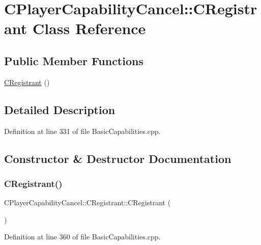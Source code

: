 \hypertarget{classCPlayerCapabilityCancel_1_1CRegistrant}{}\section{C\+Player\+Capability\+Cancel\+:\+:C\+Registrant Class Reference}
\label{classCPlayerCapabilityCancel_1_1CRegistrant}
\subsection*{Public Member Functions}
\begin{DoxyCompactItemize}
\item 
\hyperlink{classCPlayerCapabilityCancel_1_1CRegistrant_a78f5bc9125ca55fc86efdabf1faaa363}{C\+Registrant} ()
\end{DoxyCompactItemize}


\subsection{Detailed Description}


Definition at line 331 of file Basic\+Capabilities.\+cpp.



\subsection{Constructor \& Destructor Documentation}
\hypertarget{classCPlayerCapabilityCancel_1_1CRegistrant_a78f5bc9125ca55fc86efdabf1faaa363}{}\label{classCPlayerCapabilityCancel_1_1CRegistrant_a78f5bc9125ca55fc86efdabf1faaa363} 
\subsubsection{\texorpdfstring{C\+Registrant()}{CRegistrant()}}
{\footnotesize\ttfamily C\+Player\+Capability\+Cancel\+::\+C\+Registrant\+::\+C\+Registrant (\begin{DoxyParamCaption}{ }\end{DoxyParamCaption})}



Definition at line 360 of file Basic\+Capabilities.\+cpp.



